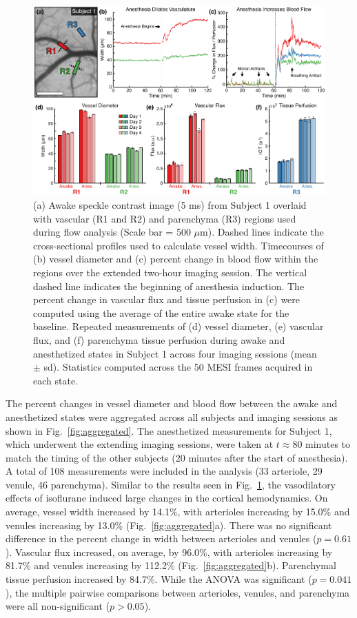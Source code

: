 \documentclass[review]{elsarticle}
\begin{document}
\begin{figure}
    \includegraphics[width=\textwidth]{Figure2.pdf}
    \caption {
        (a) Awake speckle contrast image (5 ms) from Subject 1 overlaid with vascular (R1 and R2) and parenchyma (R3) regions used during flow analysis (Scale bar = 500 $\mu$m). Dashed lines indicate the cross-sectional profiles used to calculate vessel width. Timecourses of (b) vessel diameter and (c) percent change in blood flow within the regions over the extended two-hour imaging session. The vertical dashed line indicates the beginning of anesthesia induction. The percent change in vascular flux and tissue perfusion in (c) were computed using the average of the entire awake state for the baseline. Repeated measurements of (d) vessel diameter, (e) vascular flux, and (f) parenchyma tissue perfusion during awake and anesthetized states in Subject 1 across four imaging sessions (mean $\pm$ sd). Statistics computed across the 50 MESI frames acquired in each state.
    }
    \label{fig:timecourse}
\end{figure}

The percent changes in vessel diameter and blood flow between the awake and anesthetized states were aggregated across all subjects and imaging sessions as shown in Fig.~\ref{fig:aggregated}. The anesthetized measurements for Subject 1, which underwent the extending imaging sessions, were taken at $t \approx 80$ minutes to match the timing of the other subjects (20 minutes after the start of anesthesia). A total of 108 measurements were included in the analysis (33 arteriole, 29 venule, 46 parenchyma). Similar to the results seen in Fig.~\ref{fig:timecourse}, the vasodilatory effects of isoflurane induced large changes in the cortical hemodynamics. On average, vessel width increased by 14.1\%, with arterioles increasing by 15.0\% and venules increasing by 13.0\% (Fig.~\ref{fig:aggregated}a). There was no significant difference in the percent change in width between arterioles and venules ($p = 0.61$). Vascular flux increased, on average, by 96.0\%, with arterioles increasing by 81.7\% and venules increasing by 112.2\% (Fig.~\ref{fig:aggregated}b). Parenchymal tissue perfusion increased by 84.7\%. While the ANOVA was significant ($p = 0.041$), the multiple pairwise comparisons between arterioles, venules, and parenchyma were all non-significant ($p > 0.05$).
\end{document}
